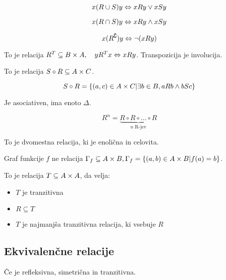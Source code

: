\[
	x (R \cup S) y \Leftrightarrow x R y \lor x S y
\]

\[
	x (R \cap S)y \Leftrightarrow x R y \land x S y
\]

\[
	x (R^\complement)y \Leftrightarrow \lnot (x R y)
\]


To je relacija $R^T \subseteq B \times A,\quad y R^T x \Leftrightarrow x R y$. Transpozicija je involucija.


To je relacija $S \circ R \subseteq A \times C$.

\[
	S \circ R = \{(a, c) \in A\times C | \exists b \in B, aRb \land bSc\}
\]

Je asociativen, ima enoto $\Delta$.


\[
	R^n = \underbrace{R \circ R \circ \ldots \circ R}_{n \text{ R-jev}}
\]


To je dvomestna relacija, ki je enolična in celovita.

Graf funkcije $f$ ne relacija $\Gamma_f \subseteq A \times B, \Gamma_f = \{(a, b)  \in A \times B | f(a) = b\}$.


To je relacija $T \subseteq A\times A$, da velja:
\begin{itemize}
	\item $T$ je tranzitivna
	\item $R \subseteq T$
	\item $T$ je najmanjša tranzitivna relacija, ki vsebuje $R$
\end{itemize}

\subsection{Ekvivalenčne relacije}


Če je refleksivna, simetrična in tranzitivna.


